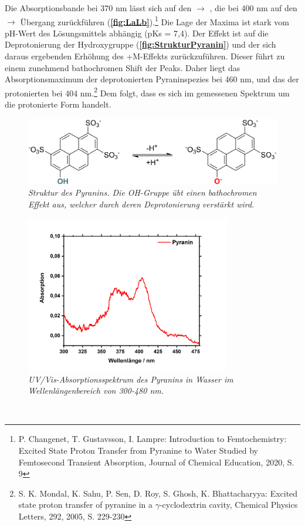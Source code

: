\documentclass[12pt,a4paper]{report}
\begin{document}
	Die Absorptionsbande bei 370 nm lässt sich auf den  $\rightarrow$ , die bei 400 nm auf den  $\rightarrow$  Übergang zurückführen (\textbf{\autoref{fig:LaLb}}).\footnote{P. Changenet, T. Gustavsson, I. Lampre: Introduction to Femtochemistry: Excited State Proton Transfer from Pyranine to Water Studied by Femtosecond Transient Absorption, Journal of Chemical Education, 2020, S. 9} 
	Die Lage der Maxima  ist stark vom pH-Wert des Lösungsmittels abhängig (pKs = 7,4). Der Effekt ist auf die Deprotonierung der Hydroxygruppe (\textbf{\autoref{fig:StrukturPyranin}}) und der sich daraus ergebenden Erhöhung des +M-Effekts zurückzuführen. Dieser führt zu einem zunehmend bathochromen Shift der Peaks. Daher liegt das Absorptionsmaximum der deprotonierten Pyraninspezies bei 460 nm, und das der protonierten bei 404 nm.\footnote{S. K. Mondal, K. Sahu, P. Sen, D. Roy, S. Ghosh, K. Bhattacharyya: Excited state proton transfer of pyranine in a $\gamma$-cyclodextrin cavity, Chemical Physics Letters, 292, 2005, S. 229-230} Dem folgt, dass es sich im gemessenen Spektrum um die protonierte Form handelt.
		\begin{figure}[h!]
			\centering
			\includegraphics*[width=\textwidth]{PyraninpH.png}
			\caption{\textnormal{\textit{Struktur des Pyranins. Die OH-Gruppe übt einen bathochromen Effekt aus, welcher durch deren  Deprotonierung verstärkt wird.}}}
			\label{fig:StrukturPyranin}
		\end{figure}
			\begin{figure}[h!]
				\centering
				\includegraphics*[width=0.8\textwidth]{UVVisPyranin.jpg}
				\caption{\textnormal{\textit{UV/Vis-Absorptionsspektrum des Pyranins in Wasser im Wellenlängenbereich von 300-480 nm.} }}
				\label{fig:UVVisPyranin}
			\end{figure}\\
\end{document}
